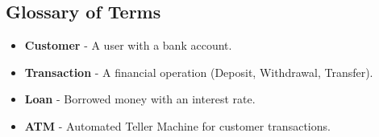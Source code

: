 \subsection{Glossary of Terms}\label{glossary-of-terms}

\begin{itemize}
\item
  \textbf{Customer} - A user with a bank account.
\item
  \textbf{Transaction} - A financial operation (Deposit, Withdrawal,
  Transfer).
\item
  \textbf{Loan} - Borrowed money with an interest rate.
\item
  \textbf{ATM} - Automated Teller Machine for customer transactions.
\end{itemize}

\subsection{}\label{section}
